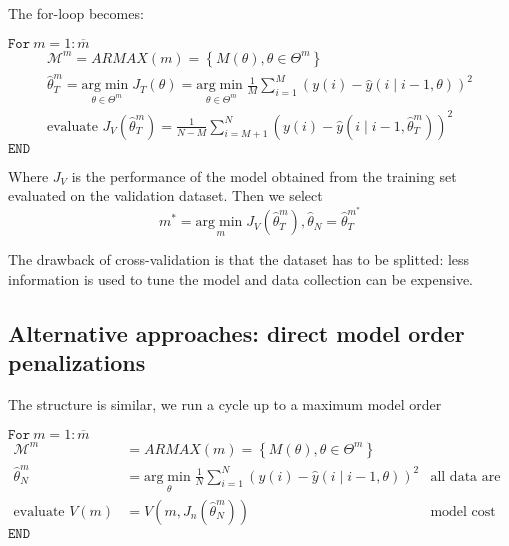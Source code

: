 The for-loop becomes:

$ \mathtt{For } \ m=1:\overline{m}$
\begin{gather*}
\mathcal{M}^{m} =ARMAX(m) =\left\{M(\theta) ,\theta \in \Theta ^{m}\right\}\\
\hat{\theta }_{T}^{m} =\underset{\theta \in \Theta ^{m}}{\mathrm{arg}\min} J_{T}(\theta) =\underset{\theta \in \Theta ^{m}}{\mathrm{arg}\min}\frac{1}{M}\sum _{i=1}^{M}(y(i) -\hat{y}(i\mid i-1,\theta))^{2}\\
\text{evaluate } J_{V}\left(\hat{\theta }_{T}^{m}\right) =\frac{1}{N-M}\sum _{i=M+1}^{N}\left(y(i) -\hat{y}\left(i\mid i-1,\hat{\theta }_{T}^{m}\right)\right)^{2}
\end{gather*}
$ \mathtt{END}$

Where $ J_{V}$ is the performance of the model obtained from the training set evaluated on the validation dataset. Then we select
\begin{equation*}
m^{*} =\underset{m}{\mathrm{arg}\min} J_{V}\left(\hat{\theta }_{T}^{m}\right) ,\hat{\theta }_{N} =\hat{\theta }_{T}^{m^{*}}
\end{equation*}



The drawback of cross-validation is that the dataset has to be splitted: less information is used to tune the model and data collection can be expensive.


\subsection{Alternative approaches: direct model order penalizations}
The structure is similar, we run a cycle up to a maximum model order

$ \mathtt{For } \ m=1:\overline{m}$
\begin{equation*}
\begin{aligned}
\mathcal{M}^{m} & =ARMAX(m) =\left\{M(\theta) ,\theta \in \Theta ^{m}\right\} & \\
\hat{\theta }_{N}^{m}  & =\underset{\theta }{\mathrm{arg}\min}\frac{1}{N}\sum _{i=1}^{N}(y(i) -\hat{y}(i\mid i-1,\theta))^{2} & \text{all data are used to tune the model}\\
\text{evaluate } V(m) & =V\left(m,J_{n}\left(\hat{\theta }_{N}^{m}\right)\right) & \text{model cost with model order penalization}
\end{aligned}
\end{equation*}
$ \mathtt{END}$

